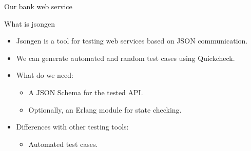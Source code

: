 \begin{frame}{Our bank web service}
  \begin{figure}
    \centering
    \begin{overprint}[\textwidth]
  \end{overprint}
  \end{figure}
\end{frame}

\begin{frame}{What is jsongen}

  \begin{itemize}
  \item Jsongen is a tool for testing web services based on JSON
    communication.

  \item We can generate automated and random test cases using
    Quickcheck.

  \item What do we need:
    \begin{itemize}
    \item A JSON Schema for the tested API.
    \item Optionally, an Erlang module for state checking.
    \end{itemize}

  \item Differences with other testing tools:
    \begin{itemize}
    \item Automated test cases.
    \end{itemize}

  \end{itemize}

\end{frame}